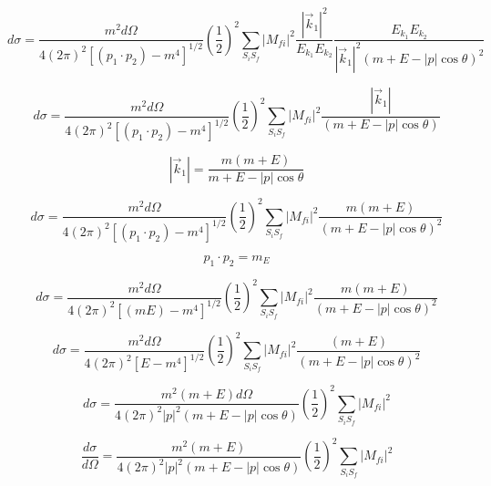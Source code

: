 \documentclass[a4]{article}
\begin{document}
    \begin{equation}
        d \sigma = \frac{m^2 d \Omega}{4 (2 \pi)^2 [(p_1 \cdot p_2) - m^4]^{1/2}} (\frac{1}{2})^2 \sum_{S_i S_f} |M_{fi}|^2 \frac{|\vec{k}_1|^2}{E_{k_1} E_{k_2}} \frac{E_{k_1} E_{k_2}}{|\vec{k}_1|^2 (m + E - |p| \cos \theta)^2}
    \end{equation}

    \begin{equation}
        d \sigma = \frac{m^2 d \Omega}{4 (2 \pi)^2 [(p_1 \cdot p_2) - m^4]^{1/2}} (\frac{1}{2})^2 \sum_{S_i S_f} |M_{fi}|^2 \frac{|\vec{k}_1|}{ (m + E - |p| \cos \theta)}
    \end{equation}

    \begin{equation}
        |\vec{k}_1| = \frac{m (m + E)}{m + E - |p| \cos \theta}
    \end{equation}

    \begin{equation}
        d \sigma = \frac{m^2 d \Omega}{4 (2 \pi)^2 [(p_1 \cdot p_2) - m^4]^{1/2}} (\frac{1}{2})^2 \sum_{S_i S_f} |M_{fi}|^2 \frac{m (m + E)}{ (m + E - |p| \cos \theta)^2}
    \end{equation}

    \[
        p_1 \cdot p_2 = m_E
    \]

    \begin{equation}
        d \sigma = \frac{m^2 d \Omega}{4 (2 \pi)^2 [(m E) - m^4]^{1/2}} (\frac{1}{2})^2 \sum_{S_i S_f} |M_{fi}|^2 \frac{m (m + E)}{(m + E - |p| \cos \theta)^2}
    \end{equation}

    \begin{equation}
        d \sigma = \frac{m^2 d \Omega}{4 (2 \pi)^2 [E - m^4]^{1/2}} (\frac{1}{2})^2 \sum_{S_i S_f} |M_{fi}|^2 \frac{(m + E)}{(m + E - |p| \cos \theta)^2}
    \end{equation}

    \begin{equation}
        d \sigma = \frac{m^2 (m + E) d \Omega}{4 (2 \pi)^2 |p|^2 (m + E - |p| \cos \theta)} (\frac{1}{2})^2 \sum_{S_i S_f} |M_{fi}|^2
    \end{equation}

    \begin{framed}
        \begin{equation}
            \frac{d \sigma}{d \Omega} = \frac{m^2 (m + E)}{4 (2 \pi)^2 |p|^2 (m + E - |p| \cos \theta)} (\frac{1}{2})^2 \sum_{S_i S_f} |M_{fi}|^2
        \end{equation}
    \end{framed}
\end{document}
